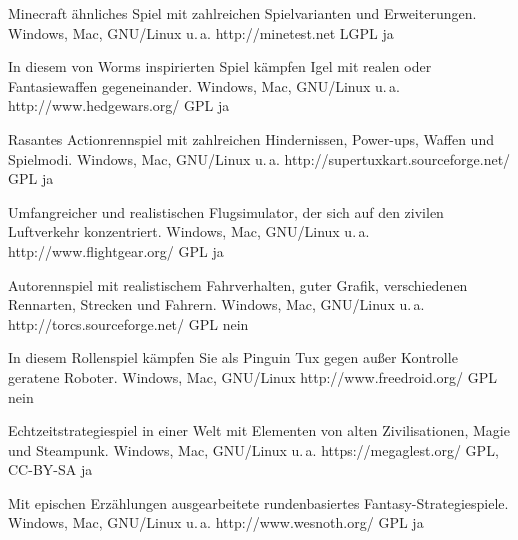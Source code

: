 



{Minecraft ähnliches Spiel mit zahlreichen Spielvarianten und Erweiterungen.}
{Windows, Mac, GNU/Linux u.\,a.}
{http://minetest.net}
{LGPL}
{ja}

{In diesem von Worms inspirierten Spiel kämpfen Igel mit realen oder Fantasiewaffen gegeneinander.}
{Windows, Mac, GNU/Linux u.\,a.}
{http://www.hedgewars.org/}
{GPL}
{ja}

{Rasantes Actionrennspiel mit zahlreichen Hindernissen, Power-ups, Waffen und Spielmodi.}
{Windows, Mac, GNU/Linux u.\,a.}
{http://supertuxkart.sourceforge.net/}
{GPL}
{ja}

{Umfangreicher und realistischen Flugsimulator, der sich auf den zivilen Luftverkehr konzentriert.}
{Windows, Mac, GNU/Linux u.\,a.}
{http://www.flightgear.org/}
{GPL}
{ja}

{Autorennspiel mit realistischem Fahrverhalten, guter Grafik, verschiedenen Rennarten, Strecken und Fahrern.}
{Windows, Mac, GNU/Linux u.\,a.}
{http://torcs.sourceforge.net/}
{GPL}
{nein}


{In diesem Rollenspiel kämpfen Sie als Pinguin Tux gegen außer Kontrolle geratene Roboter.}
{Windows, Mac, GNU/Linux}
{http://www.freedroid.org/}
{GPL}
{nein}

{Echtzeitstrategiespiel in einer Welt mit Elementen von alten Zivilisationen, Magie und Steampunk.}
{Windows, Mac, GNU/Linux u.\,a.}
{https://megaglest.org/}
{GPL, CC-BY-SA}
{ja}

{Mit epischen Erzählungen ausgearbeitete rundenbasiertes Fantasy-Strategiespiele.}
{Windows, Mac, GNU/Linux u.\,a.}
{http://www.wesnoth.org/}
{GPL}
{ja}

\backpage


